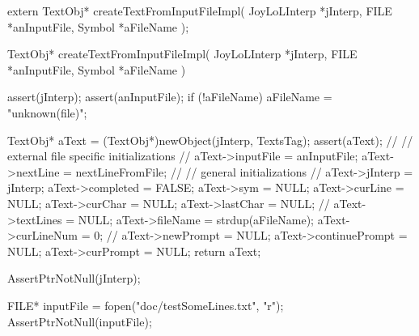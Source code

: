 \startCHeader
extern TextObj* createTextFromInputFileImpl(
  JoyLoLInterp *jInterp,
  FILE         *anInputFile,
  Symbol       *aFileName
);
\stopCHeader
{}

\startCCode
TextObj* createTextFromInputFileImpl(
  JoyLoLInterp *jInterp,
  FILE         *anInputFile,
  Symbol       *aFileName
) {
  assert(jInterp);
  assert(anInputFile);
  if (!aFileName) aFileName = "unknown(file)";
  
  TextObj* aText = (TextObj*)newObject(jInterp, TextsTag);
  assert(aText);
  //
  // external file specific initializations
  //
  aText->inputFile  = anInputFile;
  aText->nextLine   = nextLineFromFile;
  //
  // general initializations
  //
  aText->jInterp    = jInterp;
  aText->completed  = FALSE;
  aText->sym        = NULL;
  aText->curLine    = NULL;
  aText->curChar    = NULL;
  aText->lastChar   = NULL;
  //
  aText->textLines  = NULL;
  aText->fileName   = strdup(aFileName);
  aText->curLineNum = 0;
  //
  aText->newPrompt      = NULL;
  aText->continuePrompt = NULL;
  aText->curPrompt      = NULL;
  return aText;
}
\stopCCode

\startCTest
  AssertPtrNotNull(jInterp);

  FILE* inputFile = fopen("doc/testSomeLines.txt", "r");
  AssertPtrNotNull(inputFile);
  
